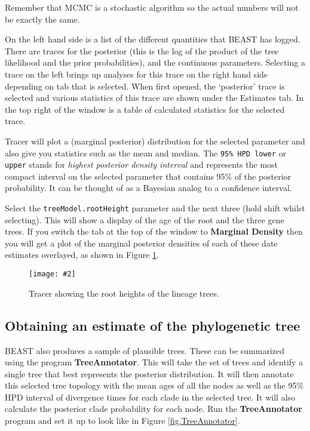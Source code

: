 \documentclass{article}
\newcommand{\includeimage}[2][]{%
\texttt{[image: \#2]}
}
\begin{document}
Remember that MCMC is a stochastic algorithm so the actual numbers will not be exactly the same.

On the left hand side is a list of the different quantities that BEAST has logged. There are traces for the posterior (this
is the log of the product of the tree likelihood and the prior probabilities), and the continuous parameters. Selecting a trace
on the left brings up analyses for this trace on the right hand side depending on tab that is selected. When first opened, the
`posterior' trace is selected and various statistics of this trace are shown under the Estimates tab.
In the top right of the window is a table of calculated statistics for the selected trace. 

Tracer will plot a (marginal posterior) distribution for the selected parameter and also give you statistics such as the mean and median. The \texttt{95\% HPD lower} or \texttt {upper} stands for {\it highest posterior density interval} and represents the most compact interval on the selected parameter that contains 95\% of the posterior probability. It can be thought of as a Bayesian analog to a confidence interval. 

Select the \texttt{treeModel.rootHeight} parameter and the next three (hold shift whilst selecting). This will show a display of the
age of the root and the three gene trees. If you switch the tab at the top of the window to {\bf Marginal Density} then you will get a plot of the marginal posterior densities of each of these date estimates overlayed,
as shown in Figure \ref{fig.tracer2}.

\begin{figure}
\centering
\includeimage[scale=0.4]{figures/Tracer2}

\caption{\label{fig.tracer2} Tracer showing the root heights of the lineage trees.}
\end{figure}


\subsection*{Obtaining an estimate of the phylogenetic tree}

BEAST also produces a sample of plausible trees. 
These can be summarized using the program {\bf TreeAnnotator}. This will take the set of trees and identify a single tree that best represents the posterior distribution. It will then annotate this selected tree topology with the mean ages of all the
nodes as well as the 95\% HPD interval of divergence times for each clade in the selected tree. It will also calculate the posterior clade probability for each
node. Run the {\bf TreeAnnotator} program and set it up to look like in Figure \ref{fig.TreeAnnotator}.
\end{document}
